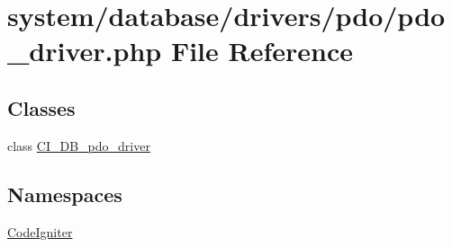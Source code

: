 \hypertarget{pdo__driver_8php}{}\section{system/database/drivers/pdo/pdo\+\_\+driver.php File Reference}
\label{pdo__driver_8php}
\subsection*{Classes}
\begin{DoxyCompactItemize}
\item 
class \mbox{\hyperlink{class_c_i___d_b__pdo__driver}{C\+I\+\_\+\+D\+B\+\_\+pdo\+\_\+driver}}
\end{DoxyCompactItemize}
\subsection*{Namespaces}
\begin{DoxyCompactItemize}
\item 
 \mbox{\hyperlink{namespace_code_igniter}{Code\+Igniter}}
\end{DoxyCompactItemize}
